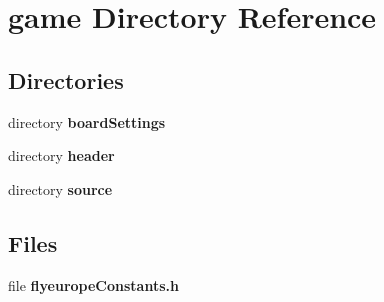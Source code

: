 \section{game Directory Reference}
\label{dir_37c6514aeece95293041e34c0f2e0784}
\subsection*{Directories}
\begin{DoxyCompactItemize}
\item 
directory {\bf board\-Settings}
\item 
directory {\bf header}
\item 
directory {\bf source}
\end{DoxyCompactItemize}
\subsection*{Files}
\begin{DoxyCompactItemize}
\item 
file {\bfseries flyeurope\-Constants.\-h}
\end{DoxyCompactItemize}

